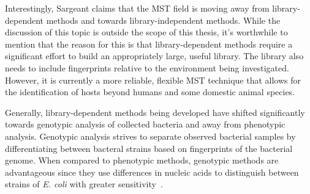 \documentclass[12pt]{ucthesis}
\begin{document}
   Interestingly, Sargeant claims that the MST field is moving away from
   library-dependent methods and towards library-independent methods. While
   the discussion of this topic is outside the scope of this thesis, it's
   worthwhile to mention that the reason for this is that library-dependent
   methods require a significant effort to build an appropriately large, useful
   library. The library also needs to include fingerprints relative to the
   environment being investigated. However, it is currently a more reliable,
   flexible MST technique that allows for the identification of hosts beyond
   humans and some domestic animal species.

   Generally, library-dependent methods being developed have shifted
   significantly towards genotypic analysis of collected bacteria and away from
   phenotypic analysis. Genotypic analysis strives to separate observed
   bacterial samples by differentiating between bacteral strains based on
   fingerprints of the bacterial genome. When compared to phenotypic methods,
   genotypic methods are advantageous since they use differences in nucleic
   acids to distinguish between strains of \textit{E. coli} with greater
   sensitivity~\cite{Anderson:Diversity, Gordon:StrainTyping, Ochman:Enzyme,
   Scott:CurrentMST, Simpson:StateOf}.
   
\end{document}
